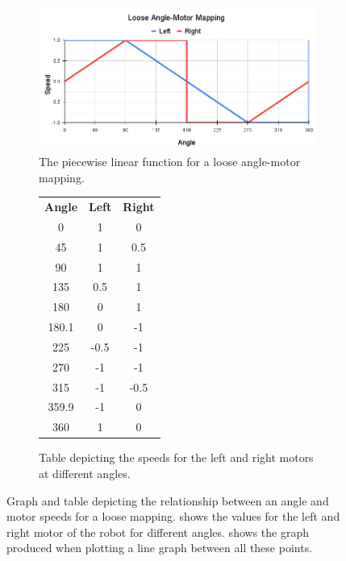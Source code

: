 \documentclass{l4proj}
\begin{document}
\begin{figure}[!h]
    \centering
    \begin{subfigure}[b]{0.75\textwidth}
        \includegraphics[width=\textwidth]{images/Loose Angle-Motor Mapping.png}
        \caption{The piecewise linear function for a loose angle-motor mapping.}
        \label{fig:loose-mapping-graph}
    \end{subfigure}
    \begin{subfigure}[b]{0.24\textwidth}
        \begin{tabular}{ccc}
            \textbf{Angle} & \textbf{Left} & \textbf{Right} \\
            0 & 1 & 0 \\
            45 & 1 & 0.5 \\
            90 & 1 & 1 \\
            135 & 0.5 & 1 \\
            180 & 0 & 1 \\
            180.1 & 0 & -1 \\
            225 & -0.5 & -1 \\
            270 & -1 & -1 \\
            315 & -1 & -0.5 \\
            359.9 & -1 & 0 \\
            360 & 1 & 0
        \end{tabular}
        \caption{Table depicting the speeds for the left and right motors at different angles.}
        \label{tab:loose-mapping-table}
    \end{subfigure}
    \caption{Graph and table depicting the relationship between an angle and motor speeds for a loose mapping.  shows the values for the left and right motor of the robot for different angles.  shows the graph produced when plotting a line graph between all these points.}
    \label{fig:loose-mapping}
\end{figure}
\end{document}
